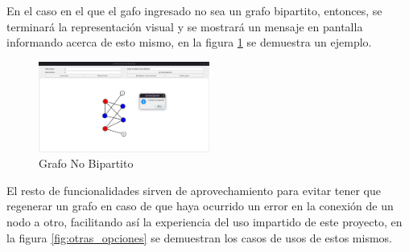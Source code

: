 \documentclass[conference]{IEEEtran}
\begin{document}
En el caso en el que el gafo ingresado no sea un grafo bipartito, entonces, se terminará la representación visual y se mostrará un mensaje en pantalla informando acerca de esto mismo, en la figura \ref{fig:no_bipartito} se demuestra un ejemplo.

\begin{figure}[htbp]
    \includegraphics[width=0.5\textwidth]{images/no_bipartito.png} 
    \caption{Grafo No Bipartito}
    \label{fig:no_bipartito}
\end{figure}

El resto de funcionalidades sirven de aprovechamiento para evitar tener que regenerar un grafo en caso de que haya ocurrido un error en la conexión de un nodo a otro, facilitando así la experiencia del uso impartido de este proyecto, en la figura \ref{fig:otras_opciones} se demuestran los casos de usos de estos mismos.
\end{document}
